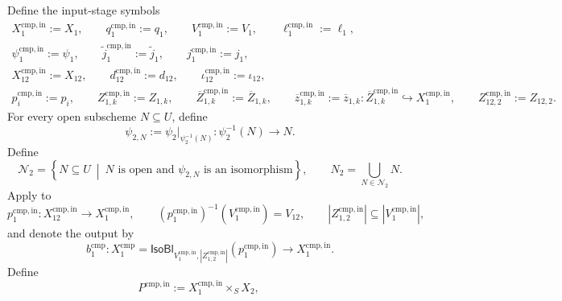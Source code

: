 \begin{definition}
  \label{def:nagata-two-open-improved-comparison}
  \lean{}

  Define the input-stage symbols
  \[
  \begin{gathered}
    X_1^{\mathrm{cmp,in}}:=X_1,\qquad
    q_1^{\mathrm{cmp,in}}:=q_1,\qquad
    V_1^{\mathrm{cmp,in}}:=V_1,\qquad
    \ell_1^{\mathrm{cmp,in}}:=\ell_1,\\
    \psi_1^{\mathrm{cmp,in}}:=\psi_1,\qquad
    \widetilde j_1^{\mathrm{cmp,in}}:=\widetilde j_1,\qquad
    j_1^{\mathrm{cmp,in}}:=j_1,\\
    X_{12}^{\mathrm{cmp,in}}:=X_{12},\qquad
    d_{12}^{\mathrm{cmp,in}}:=d_{12},\qquad
    \iota_{12}^{\mathrm{cmp,in}}:=\iota_{12},\\
    p_i^{\mathrm{cmp,in}}:=p_i,\qquad
    Z_{1,k}^{\mathrm{cmp,in}}:=Z_{1,k},\qquad
    \overline Z_{1,k}^{\mathrm{cmp,in}}:=\overline Z_{1,k},\qquad
    \overline z_{1,k}^{\mathrm{cmp,in}}:=\overline z_{1,k}\colon
      \overline Z_{1,k}^{\mathrm{cmp,in}}
        \hookrightarrow X_1^{\mathrm{cmp,in}},\qquad
    Z_{12,2}^{\mathrm{cmp,in}}:=Z_{12,2}.
  \end{gathered}                                                   \tag{CMP0}
  \]
  For every open subscheme $N\subseteq U$, define
  \[
    \psi_{2,N}:=\psi_2|_{\psi_2^{-1}(N)}\colon
      \psi_2^{-1}(N)\longrightarrow N.
  \]
  Define
  \[
    \mathscr N_2
      =\left\{
          N\subseteq U\ \middle|\
          N\text{ is open and }\psi_{2,N}
          \text{ is an isomorphism}
        \right\},
    \qquad
    N_2=\bigcup_{N\in\mathscr N_2}N.
  \]
  Apply  to
  \[
    p_1^{\mathrm{cmp,in}}\colon X_{12}^{\mathrm{cmp,in}}
      \to X_1^{\mathrm{cmp,in}},\qquad
    (p_1^{\mathrm{cmp,in}})^{-1}(V_1^{\mathrm{cmp,in}})=V_{12},\qquad
    |Z_{1,2}^{\mathrm{cmp,in}}|\subseteq|V_1^{\mathrm{cmp,in}}|,
  \]
  and denote the output by
  \[
    b_1^{\mathrm{cmp}}\colon
      X_1^{\mathrm{cmp}}
      =\mathsf{IsoBl}_{V_1^{\mathrm{cmp,in}},
        |Z_{1,2}^{\mathrm{cmp,in}}|}(p_1^{\mathrm{cmp,in}})
      \longrightarrow X_1^{\mathrm{cmp,in}}.                     \tag{C1}
  \]
  Define
  \[
    P^{\mathrm{cmp,in}}:=X_1^{\mathrm{cmp,in}}\times_SX_2,\qquad
\]
\end{definition}
